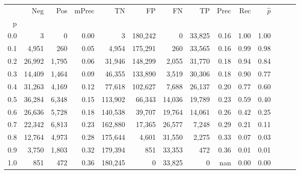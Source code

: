 \begin{tabular}{rrrrrrrrrrrrrr}
\toprule
{} &     Neg &    Pos & mPrec &       TN &       FP &      FN &      TP &  Prec &   Rec & $\hat{p}$ \\
p   &         &        &       &          &          &         &         &       &       &           \\
\midrule
0.0 &       3 &      0 &  0.00 &        3 &  180,242 &       0 &  33,825 &  0.16 &  1.00 &      1.00 \\
0.1 &   4,951 &    260 &  0.05 &    4,954 &  175,291 &     260 &  33,565 &  0.16 &  0.99 &      0.98 \\
0.2 &  26,992 &  1,795 &  0.06 &   31,946 &  148,299 &   2,055 &  31,770 &  0.18 &  0.94 &      0.84 \\
0.3 &  14,409 &  1,464 &  0.09 &   46,355 &  133,890 &   3,519 &  30,306 &  0.18 &  0.90 &      0.77 \\
0.4 &  31,263 &  4,169 &  0.12 &   77,618 &  102,627 &   7,688 &  26,137 &  0.20 &  0.77 &      0.60 \\
0.5 &  36,284 &  6,348 &  0.15 &  113,902 &   66,343 &  14,036 &  19,789 &  0.23 &  0.59 &      0.40 \\
0.6 &  26,636 &  5,728 &  0.18 &  140,538 &   39,707 &  19,764 &  14,061 &  0.26 &  0.42 &      0.25 \\
0.7 &  22,342 &  6,813 &  0.23 &  162,880 &   17,365 &  26,577 &   7,248 &  0.29 &  0.21 &      0.11 \\
0.8 &  12,764 &  4,973 &  0.28 &  175,644 &    4,601 &  31,550 &   2,275 &  0.33 &  0.07 &      0.03 \\
0.9 &   3,750 &  1,803 &  0.32 &  179,394 &      851 &  33,353 &     472 &  0.36 &  0.01 &      0.01 \\
1.0 &     851 &    472 &  0.36 &  180,245 &        0 &  33,825 &       0 &   nan &  0.00 &      0.00 \\
\bottomrule
\end{tabular}
